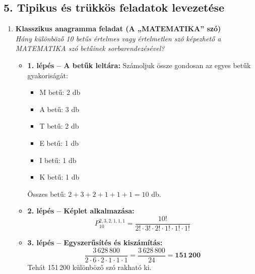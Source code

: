 \documentclass[11pt, a4paper]{article}
\begin{document}
\subsection*{5. Tipikus és trükkös feladatok levezetése}

\begin{enumerate}[label=\arabic*., leftmargin=*]
    \item \textbf{Klasszikus anagramma feladat (A „MATEMATIKA” szó)}\\
    \textit{Hány különböző 10 betűs értelmes vagy értelmetlen szó képezhető a MATEMATIKA szó betűinek sorbarendezésével?}
    \begin{itemize}
        \item \textbf{1. lépés – A betűk leltára:} Számoljuk össze gondosan az egyes betűk gyakoriságát:
        \begin{itemize}
            \item M betű: 2 db
            \item A betű: 3 db
            \item T betű: 2 db
            \item E betű: 1 db
            \item I betű: 1 db
            \item K betű: 1 db
        \end{itemize}
        Összes betű: $2 + 3 + 2 + 1 + 1 + 1 = 10$ db.
        \item \textbf{2. lépés – Képlet alkalmazása:}
        \[
        P_{10}^{2, 3, 2, 1, 1, 1} = \frac{10!}{2! \cdot 3! \cdot 2! \cdot 1! \cdot 1! \cdot 1!}
        \]
        \item \textbf{3. lépés – Egyszerűsítés és kiszámítás:}
        \[
        \frac{3\,628\,800}{2 \cdot 6 \cdot 2 \cdot 1 \cdot 1 \cdot 1} = \frac{3\,628\,800}{24} = \mathbf{151\,200}
        \]
        Tehát 151\,200 különböző szó rakható ki.
    \end{itemize}

    \begin{center}
\end{center}
\end{enumerate}
\end{document}
